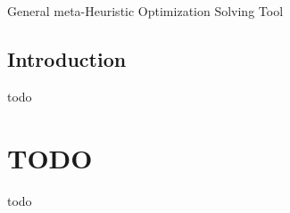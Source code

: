 General meta-\/\-Heuristic Optimization Solving Tool

\subsection*{Introduction }

todo

\section*{T\-O\-D\-O }

todo 